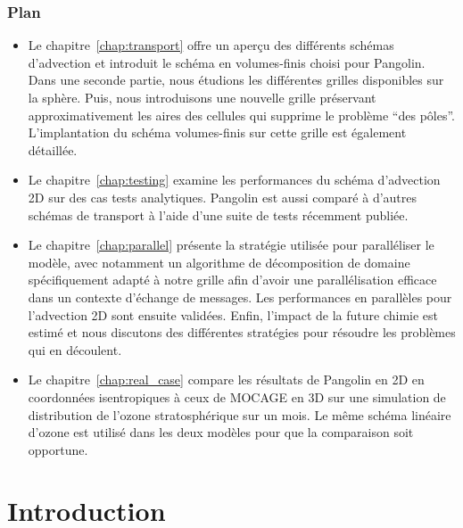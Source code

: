 \subsection*{Plan}
\begin{itemize}
  \item Le chapitre~\ref{chap:transport} offre un aperçu des différents schémas
  d'advection et introduit le schéma en volumes-finis choisi pour Pangolin. Dans
  une seconde partie, nous étudions les différentes grilles disponibles sur la
  sphère. Puis, nous introduisons une nouvelle grille préservant
  approximativement les aires des cellules qui supprime le problème \enquote{des
  p\^oles}.
  L'implantation du schéma volumes-finis sur cette grille est également
  détaillée.
  \item Le chapitre~\ref{chap:testing} examine les performances du schéma
  d'advection 2D sur des cas tests analytiques. Pangolin est aussi comparé à
  d'autres schémas de transport à l'aide d'une suite de tests récemment publiée.
  \item Le chapitre~\ref{chap:parallel} présente la stratégie utilisée pour
  paralléliser le modèle, avec notamment un algorithme de décomposition de
  domaine spécifiquement adapté à notre grille afin d'avoir une parallélisation
  efficace dans un contexte d'échange de messages. Les performances en
  parallèles pour l'advection 2D sont ensuite validées. Enfin, l'impact de la
  future chimie est estimé et nous discutons des différentes stratégies pour
  résoudre les problèmes qui en découlent.
  \item Le chapitre~\ref{chap:real_case} compare les résultats de Pangolin en 2D
    en coordonnées isentropiques à ceux de MOCAGE en 3D sur une simulation de
  distribution de l'ozone stratosphérique sur un mois. Le même schéma
  linéaire d'ozone est utilisé dans les deux modèles pour que la comparaison
  soit opportune.
\end{itemize}



\chapter*[Introduction]{Introduction}

